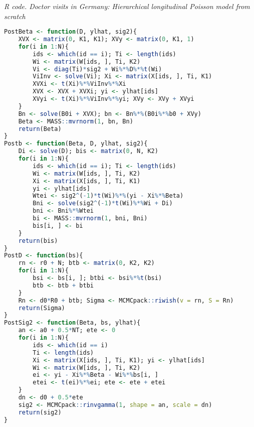 \begin{enumerate}[leftmargin=*]
\begin{tcolorbox}[enhanced,width=4.67in,center upper,
	fontupper=\large\bfseries,drop shadow southwest,sharp corners]
	\textit{R code. Doctor visits in Germany: Hierarchical longitudinal Poisson model from scratch}
	\begin{VF}
		\begin{lstlisting}[language=R]
PostBeta <- function(D, ylhat, sig2){
	XVX <- matrix(0, K1, K1); XVy <- matrix(0, K1, 1)
	for(i in 1:N){
		ids <- which(id == i); Ti <- length(ids)
		Wi <- matrix(W[ids, ], Ti, K2)
		Vi <- diag(Ti)*sig2 + Wi%*%D%*%t(Wi)
		ViInv <- solve(Vi); Xi <- matrix(X[ids, ], Ti, K1)
		XVXi <- t(Xi)%*%ViInv%*%Xi
		XVX <- XVX + XVXi; yi <- ylhat[ids]
		XVyi <- t(Xi)%*%ViInv%*%yi; XVy <- XVy + XVyi
	}
	Bn <- solve(B0i + XVX); bn <- Bn%*%(B0i%*%b0 + XVy)
	Beta <- MASS::mvrnorm(1, bn, Bn)
	return(Beta)
}
Postb <- function(Beta, D, ylhat, sig2){
	Di <- solve(D); bis <- matrix(0, N, K2)
	for(i in 1:N){
		ids <- which(id == i); Ti <- length(ids)
		Wi <- matrix(W[ids, ], Ti, K2)
		Xi <- matrix(X[ids, ], Ti, K1)
		yi <- ylhat[ids]
		Wtei <- sig2^(-1)*t(Wi)%*%(yi - Xi%*%Beta)
		Bni <- solve(sig2^(-1)*t(Wi)%*%Wi + Di)
		bni <- Bni%*%Wtei
		bi <- MASS::mvrnorm(1, bni, Bni)
		bis[i, ] <- bi
	}
	return(bis)
}
PostD <- function(bs){
	rn <- r0 + N; btb <- matrix(0, K2, K2)
	for(i in 1:N){
		bsi <- bs[i, ]; btbi <- bsi%*%t(bsi)
		btb <- btb + btbi
	}
	Rn <- d0*R0 + btb; Sigma <- MCMCpack::riwish(v = rn, S = Rn)
	return(Sigma)
}
PostSig2 <- function(Beta, bs, ylhat){
	an <- a0 + 0.5*NT; ete <- 0
	for(i in 1:N){
		ids <- which(id == i)
		Ti <- length(ids)
		Xi <- matrix(X[ids, ], Ti, K1); yi <- ylhat[ids]
		Wi <- matrix(W[ids, ], Ti, K2)
		ei <- yi - Xi%*%Beta - Wi%*%bs[i, ]
		etei <- t(ei)%*%ei; ete <- ete + etei
	}
	dn <- d0 + 0.5*ete 
	sig2 <- MCMCpack::rinvgamma(1, shape = an, scale = dn)
	return(sig2)
}
\end{lstlisting}
	\end{VF}
\end{tcolorbox} 


\end{enumerate}
